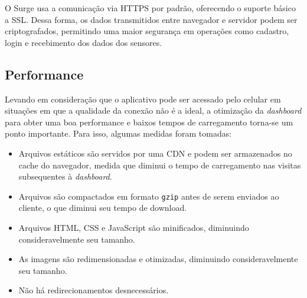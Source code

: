 O Surge usa a comunicação via HTTPS por padrão, oferecendo o suporte básico a SSL. Dessa forma, os dados transmitidos entre navegador e servidor podem ser criptografados, permitindo uma maior segurança em operações como cadastro, login e recebimento dos dados dos sensores.

\subsection{Performance}

Levando em consideração que o aplicativo pode ser acessado pelo celular em situações em que a qualidade da conexão não é a ideal, a otimização da \textit{dashboard} para obter uma boa performance e baixos tempos de carregamento torna-se um ponto importante. Para isso, algumas medidas foram tomadas:

\begin{itemize}
\item Arquivos estáticos são servidos por uma CDN e podem ser armazenados no cache do navegador, medida que diminui o tempo de carregamento nas visitas subsequentes à \textit{dashboard}.
\item Arquivos são compactados em formato \texttt{gzip} antes de serem enviados ao cliente, o que diminui seu tempo de download.
\item Arquivos HTML, CSS e JavaScript são minificados, diminuindo consideravelmente seu tamanho.
\item As imagens são redimensionadas e otimizadas, diminuindo consideravelmente seu tamanho.
\item Não há redirecionamentos desnecessários.
\end{itemize}
